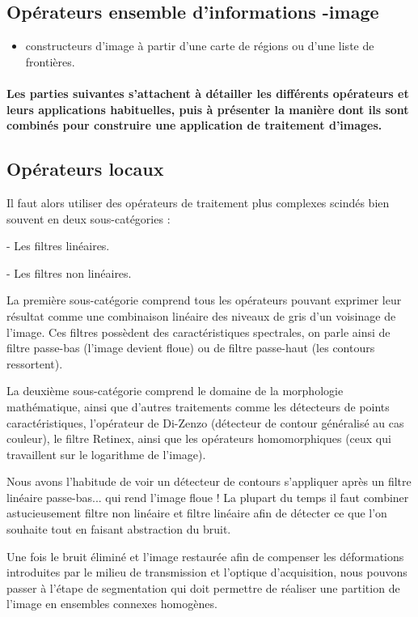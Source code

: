 \documentclass[11pt]{report}
\begin{document}
\subsection*{Opérateurs ensemble d'informations -image}
\begin{itemize}
	\item 
	constructeurs d'image à partir d'une carte de régions ou d'une liste de frontières.
\end{itemize}
\paragraph{
Les parties suivantes s'attachent à détailler les différents opérateurs et leurs
applications habituelles, puis à présenter la manière dont ils sont combinés pour construire
une application de traitement d'images.}

\subsection{Opérateurs locaux}
Il faut alors utiliser des opérateurs de traitement plus complexes scindés bien
souvent en deux sous-catégories :

- Les filtres linéaires.

- Les filtres non linéaires.


La première sous-catégorie comprend tous les opérateurs pouvant exprimer leur
résultat comme une combinaison linéaire des niveaux de gris d'un voisinage de l'image. Ces
filtres possèdent des caractéristiques spectrales, on parle ainsi de filtre passe-bas (l'image
devient floue) ou de filtre passe-haut (les contours ressortent).

La deuxième sous-catégorie comprend le domaine de la morphologie mathématique,
ainsi que d'autres traitements comme les détecteurs de points caractéristiques, l'opérateur
de Di-Zenzo (détecteur de contour généralisé au cas couleur), le filtre Retinex, ainsi que les
opérateurs homomorphiques (ceux qui travaillent sur le logarithme de l'image).

Nous avons l'habitude de voir un détecteur de contours s'appliquer après un filtre
linéaire passe-bas... qui rend l'image floue ! La plupart du temps il faut combiner
astucieusement filtre non linéaire et filtre linéaire afin de détecter ce que l'on souhaite tout
en faisant abstraction du bruit.

Une fois le bruit éliminé et l'image restaurée afin de compenser les déformations
introduites par le milieu de transmission et l'optique d'acquisition, nous pouvons passer à
l'étape de segmentation qui doit permettre de réaliser une partition de l'image en
ensembles connexes homogènes.
\end{document}
